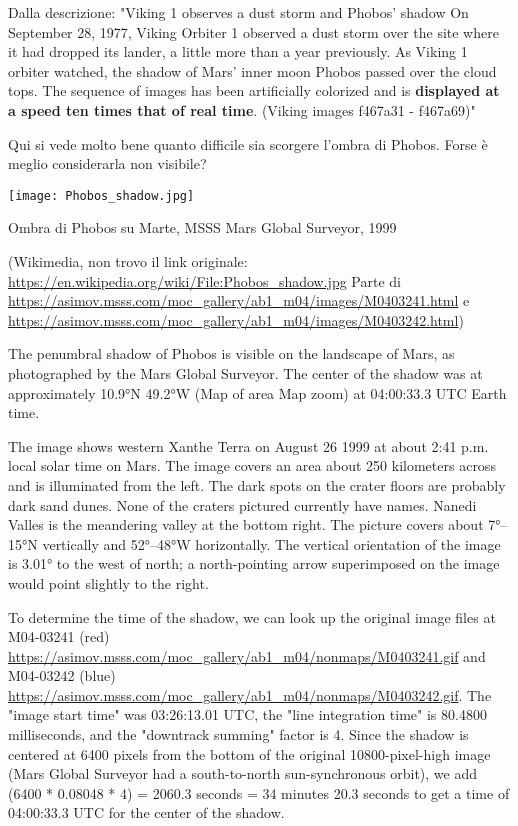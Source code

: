\documentclass[a4paper,10pt,openany,oneside]{memoir}
\begin{document}
Dalla descrizione: "Viking 1 observes a dust storm and Phobos’ shadow On September 28, 1977, Viking Orbiter 1 observed a dust storm over the site where it had dropped its lander, a little more than a year previously. As Viking 1 orbiter watched, the shadow of Mars' inner moon Phobos passed over the cloud tops. The sequence of images has been artificially colorized and is \textbf{displayed at a speed ten times that of real time}. (Viking images f467a31 - f467a69)"

Qui si vede molto bene quanto difficile sia scorgere l'ombra di Phobos. Forse è meglio considerarla non visibile?


\texttt{[image: Phobos\_shadow.jpg]}

Ombra di Phobos su Marte, MSSS Mars Global Surveyor, 1999

(Wikimedia, non trovo il link originale: \url{https://en.wikipedia.org/wiki/File:Phobos_shadow.jpg} Parte di \url{https://asimov.msss.com/moc_gallery/ab1_m04/images/M0403241.html} e \url{https://asimov.msss.com/moc_gallery/ab1_m04/images/M0403242.html}) 

The penumbral shadow of Phobos is visible on the landscape of Mars, as photographed by the Mars Global Surveyor. The center of the shadow was at approximately 10.9°N 49.2°W (Map of area Map zoom) at 04:00:33.3 UTC Earth time.

The image shows western Xanthe Terra on August 26 1999 at about 2:41 p.m. local solar time on Mars. The image covers an area about 250 kilometers across and is illuminated from the left. The dark spots on the crater floors are probably dark sand dunes. None of the craters pictured currently have names. Nanedi Valles is the meandering valley at the bottom right. The picture covers about 7°–15°N vertically and 52°–48°W horizontally. The vertical orientation of the image is 3.01° to the west of north; a north-pointing arrow superimposed on the image would point slightly to the right.

To determine the time of the shadow, we can look up the original image files at M04-03241 (red) \url{https://asimov.msss.com/moc_gallery/ab1_m04/nonmaps/M0403241.gif} and M04-03242 (blue) \url{https://asimov.msss.com/moc_gallery/ab1_m04/nonmaps/M0403242.gif}. The "image start time" was 03:26:13.01 UTC, the "line integration time" is 80.4800 milliseconds, and the "downtrack summing" factor is 4. Since the shadow is centered at 6400 pixels from the bottom of the original 10800-pixel-high image (Mars Global Surveyor had a south-to-north sun-synchronous orbit), we add (6400 * 0.08048 * 4) = 2060.3 seconds = 34 minutes 20.3 seconds to get a time of 04:00:33.3 UTC for the center of the shadow. 
\end{document}
